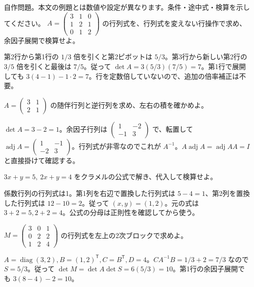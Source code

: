 \documentclass[11pt]{article}
\begin{document}
自作問題。本文の例題とは数値や設定が異なります。条件・途中式・検算を示してください。
\problem[消去と行列式]
$A=\begin{pmatrix}3&1&0\\1&2&1\\0&1&2\end{pmatrix}$ の行列式を、行列式を変えない行操作で求め、余因子展開で検算せよ。
\begin{ans}
第2行から第1行の $1/3$ 倍を引くと第2ピボットは $5/3$。第3行から新しい第2行の $3/5$ 倍を引くと最後は $7/5$。従って $\det A=3(5/3)(7/5)=7$。第1行で展開しても $3(4-1)-1\cdot2=7$。行を定数倍していないので、追加の倍率補正は不要。
\end{ans}
\problem[随伴行列]
$A=\begin{pmatrix}3&1\\2&1\end{pmatrix}$ の随伴行列と逆行列を求め、左右の積を確かめよ。
\begin{ans}
$\det A=3-2=1$。余因子行列は $\begin{pmatrix}1&-2\\-1&3\end{pmatrix}$ で、転置して $\operatorname{adj}A=\begin{pmatrix}1&-1\\-2&3\end{pmatrix}$。行列式が非零なのでこれが $A^{-1}$。$A\operatorname{adj}A=\operatorname{adj}A A=I$ と直接掛けて確認する。
\end{ans}
\newpage
\problem[クラメルの公式]
$3x+y=5,\ 2x+y=4$ をクラメルの公式で解き、代入して検算せよ。
\begin{ans}
係数行列の行列式は1。第1列を右辺で置換した行列式は $5-4=1$、第2列を置換した行列式は $12-10=2$。従って $(x,y)=(1,2)$。元の式は $3+2=5,2+2=4$。公式の分母は正則性を確認してから使う。
\end{ans}
\problem[Schur補行列]
$M=\begin{pmatrix}3&0&1\\0&2&2\\1&2&4\end{pmatrix}$ の行列式を左上の2次ブロックで求めよ。
\begin{ans}
$A=\operatorname{diag}(3,2),B=(1,2)^{\mathsf T},C=B^{\mathsf T},D=4$。$CA^{-1}B=1/3+2=7/3$ なので $S=5/3$。従って $\det M=\det A\det S=6(5/3)=10$。第1行の余因子展開でも $3(8-4)-2=10$。
\end{ans}
\end{document}
